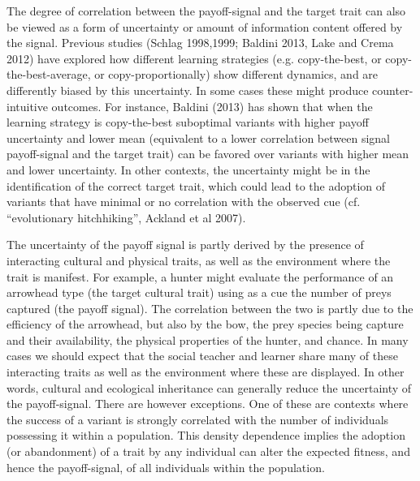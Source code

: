 \documentclass[preprint,authoryear]{elsarticle}
\begin{document}
The degree of correlation between the payoff-signal and the target trait can also be viewed as a form of uncertainty or amount of information content offered by the signal. Previous studies (Schlag 1998,1999; Baldini 2013, Lake and Crema 2012) have explored how different learning strategies (e.g. copy-the-best, or copy-the-best-average, or copy-proportionally) show different dynamics, and are differently biased by this uncertainty. In some cases these might produce counter-intuitive outcomes. For instance, Baldini (2013) has shown that when the learning strategy is  copy-the-best suboptimal variants with higher payoff uncertainty and lower mean (equivalent to a lower correlation between signal payoff-signal and the target trait) can be favored over variants with higher mean and lower uncertainty. In other contexts, the uncertainty might be in the identification of the correct target trait, which could lead to the adoption of variants that have minimal or no correlation with the observed cue (cf. “evolutionary hitchhiking”,  Ackland et al 2007). 

The uncertainty of the payoff signal is partly derived by the presence of interacting cultural and physical traits, as well as the environment where the trait is manifest. For example, a hunter might evaluate the performance of an arrowhead type (the target cultural trait) using as a cue the number of preys captured (the payoff signal). The correlation between the two is partly due to the efficiency of the arrowhead, but also by the bow, the prey species being capture and their availability,  the physical properties of the hunter, and chance. In many cases we should expect that the social teacher and learner share many of these interacting traits as well as the environment where these are displayed. In other words, cultural and ecological inheritance can generally reduce the uncertainty of the payoff-signal. There are however exceptions. One of these are contexts where the success of a variant is strongly correlated with the number of individuals possessing it within a population. This density dependence implies the adoption (or abandonment) of a trait by any individual can alter the expected fitness, and hence the payoff-signal, of all individuals within the population. 
\end{document}
